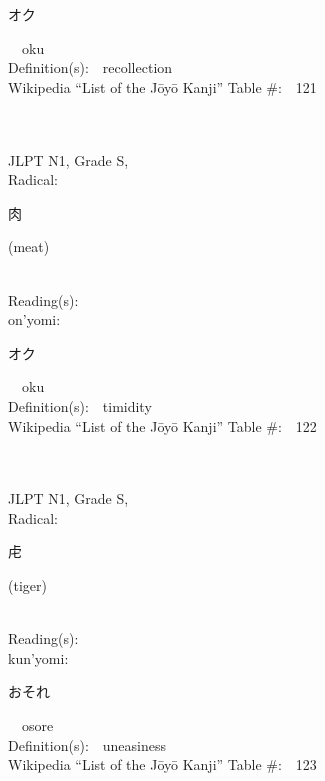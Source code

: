 \begin{multicols}{2}
{\hspace*{2em}}{\begin{CJK}{UTF8}{min} オク \end{CJK}}\ \ oku\ \ \\
Definition(s):\ \ recollection \\
Wikipedia ``List of the J\=oy\=o Kanji'' Table \#:\ \ 121 \\
\ \ \\
{\fontsize{34pt}{40pt}  }\ \ \\
{JLPT N1, Grade S, \\Radical:\ \ {\begin{CJK}{UTF8}{min} 肉 \end{CJK}} (meat) } \\
Reading(s):\ \ \\
{\hspace*{1em}}on'yomi:\ \ \\
{\hspace*{2em}}{\begin{CJK}{UTF8}{min} オク \end{CJK}}\ \ oku\ \ \\
Definition(s):\ \ timidity \\
Wikipedia ``List of the J\=oy\=o Kanji'' Table \#:\ \ 122 \\
\ \ \\
{\fontsize{34pt}{40pt}  }\ \ \\
{JLPT N1, Grade S, \\Radical:\ \ {\begin{CJK}{UTF8}{min} 虍 \end{CJK}} (tiger) } \\
Reading(s):\ \ \\
{\hspace*{1em}}kun'yomi:\ \ \\
{\hspace*{2em}}{\begin{CJK}{UTF8}{min} おそれ \end{CJK}}\ \ osore\ \ \\
Definition(s):\ \ uneasiness \\
Wikipedia ``List of the J\=oy\=o Kanji'' Table \#:\ \ 123 \\
\ \ \\
{\fontsize{34pt}{40pt}  }\ \ \\

\end{multicols}
